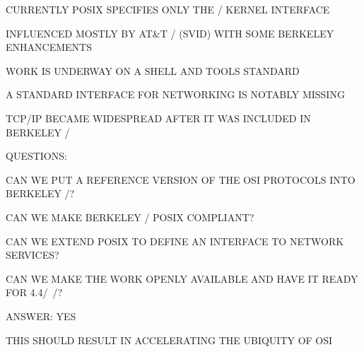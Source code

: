 \begin{bwslide}

\begin{nrtc}
\item	CURRENTLY POSIX SPECIFIES ONLY THE \unix/ KERNEL INTERFACE
    \begin{nrtc}
    \item	INFLUENCED MOSTLY BY AT\&T \unix/ (SVID) WITH SOME BERKELEY
		ENHANCEMENTS
    \end{nrtc}

\item	WORK IS UNDERWAY ON A SHELL AND TOOLS STANDARD

\item	A STANDARD INTERFACE FOR NETWORKING IS NOTABLY MISSING
\end{nrtc}
\end{bwslide}


\begin{bwslide}

\begin{nrtc}
\item	TCP/IP BECAME WIDESPREAD AFTER IT WAS INCLUDED IN BERKELEY \unix/

\item	QUESTIONS:
    \begin{nrtc}
    \item	CAN WE PUT A REFERENCE VERSION OF THE OSI PROTOCOLS INTO
		BERKELEY \unix/?

    \item	CAN WE MAKE BERKELEY \unix/ POSIX COMPLIANT?

    \item	CAN WE EXTEND POSIX TO DEFINE AN INTERFACE TO NETWORK SERVICES?

    \item	CAN WE MAKE THE WORK OPENLY AVAILABLE AND HAVE IT READY FOR
		4.4\bsd/~\unix/?
    \end{nrtc}

\item	ANSWER: YES

\item	THIS SHOULD RESULT IN ACCELERATING THE UBIQUITY OF OSI
\end{nrtc}
\end{bwslide}


